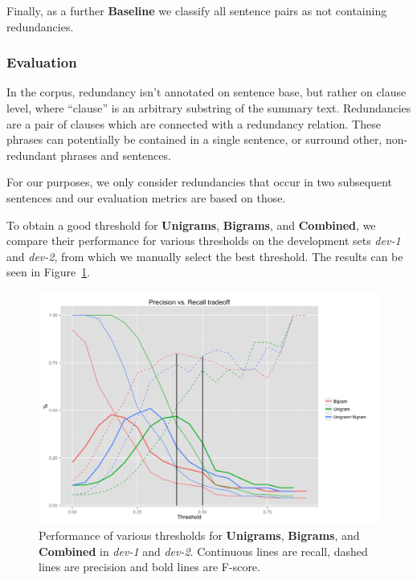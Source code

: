\documentclass[a4paper,10pt]{scrartcl}
\theoremstyle{style}
\begin{document}
Finally, as a further \textbf{Baseline} we classify all sentence pairs as not containing redundancies.

\subsubsection{Evaluation}

In the corpus, redundancy isn't annotated on sentence base, but rather on clause level, where ``clause'' is an arbitrary substring of the summary text. Redundancies are a pair of clauses which are connected with a redundancy relation.
These phrases can potentially be contained in a single sentence, or surround other, non-redundant phrases and sentences.

For our purposes, we only consider redundancies that occur in two subsequent sentences and our evaluation metrics are based on those.

To obtain a good threshold for \textbf{Unigrams}, \textbf{Bigrams}, and \textbf{Combined}, we compare their performance for various thresholds on the development sets \textit{dev-1} and \textit{dev-2}, from which we manually select the best threshold. The results can be seen in Figure~\ref{redundancy_graph}.

\begin{figure}
\begin{center}
\includegraphics[scale=0.15]{a.png}
\end{center}
\caption{Performance of various thresholds for \textbf{Unigrams}, \textbf{Bigrams}, and \textbf{Combined} in \textit{dev-1} and \textit{dev-2}. Continuous lines are recall, dashed lines are precision and bold lines are F-score.}
\label{redundancy_graph}
\end{figure}
\end{document}
